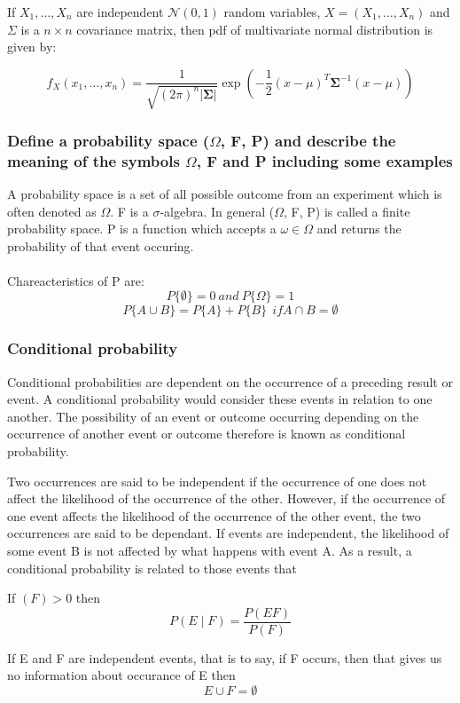 If $X_1,\ldots,X_n$ are independent $\mathcal{N}(0,1)$ random variables, $X=(X_1,\ldots,X_n)$ and $\Sigma$ is a $n\times n$ covariance matrix, then pdf of multivariate normal distribution is given by: 

$$f_X(x_1, \ldots, x_n)=\frac{1}{\sqrt{(2\pi)^n|\boldsymbol\Sigma|}}
\exp\left(-\frac{1}{2}({x}-{\mu})^T{\boldsymbol\Sigma}^{-1}({x}-{\mu})
\right)$$


\subsubsection{Define a probability space ($\Omega$, F, P) and describe the meaning of the symbols $\Omega$, F and P including some examples}

A probability space is a set of all possible outcome from an experiment which is often denoted as $\Omega$. F is a $\sigma$-algebra. In general ($\Omega$, F, P) is called a finite probability space. P is a function which accepts a $\omega \in \Omega$ and returns the probability of that event occuring.\\ \\
Chareacteristics of P are:
$$P \{\emptyset\} = 0 \  and \ P\{\Omega\} = 1 $$
$$ P\{A \cup B\} = P\{A\} + P\{B\} \  \ if A \cap B = \emptyset $$

\subsubsection{Conditional probability}
Conditional probabilities are dependent on the occurrence of a preceding result or event. A conditional probability would consider these events in relation to one another. The possibility of an event or outcome occurring depending on the occurrence of another event or outcome therefore is known as conditional probability.

\noindent Two occurrences are said to be independent if the occurrence of one does not affect the likelihood of the occurrence of the other. However, if the occurrence of one event affects the likelihood of the occurrence of the other event, the two occurrences are said to be dependant. If events are independent, the likelihood of some event B is not affected by what happens with event A. As a result, a conditional probability is related to those events that

If $ (F) > 0 $ then $$P(E \mid F) = \frac{P(EF)}{P(F)}$$

If E and F are independent events, that is to say, if F occurs, then that gives us no information about occurance of E then 
$$ E \cup  F = \emptyset $$

